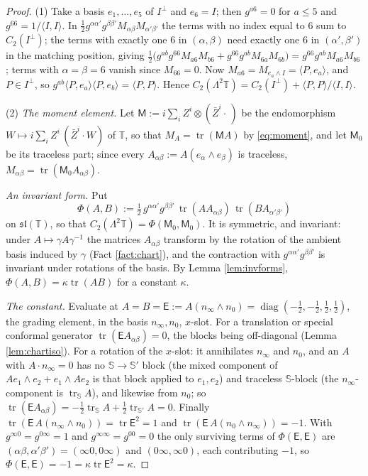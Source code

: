 \documentclass[11pt]{article}
\theoremstyle{definition}
\newcommand{\T}{\mathbb{T}}
\newcommand{\tr}{\operatorname{tr}}
\newcommand{\ip}[2]{\langle #1, #2\rangle}
\newcommand{\Sc}{\mathbb{S}}
\begin{document}
\begin{proof}
(1) Take a basis $e_{1}, \dots, e_{5}$ of $I^{\perp}$ and $e_{6} = I$; then $g^{a6} = 0$ for $a \le 5$ and $g^{66} = 1/\ip{I}{I}$. In $\tfrac12 g^{\alpha\alpha'}g^{\beta\beta'}M_{\alpha\beta}M_{\alpha'\beta'}$ the terms with no index equal to $6$ sum to $C_{2}(I^{\perp})$; the terms with exactly one $6$ in $(\alpha,\beta)$ need exactly one $6$ in $(\alpha',\beta')$ in the matching position, giving $\tfrac12\bigl(g^{ab}g^{66}M_{a6}M_{b6} + g^{66}g^{ab}M_{6a}M_{6b}\bigr) = g^{66}g^{ab}M_{a6}M_{b6}$; terms with $\alpha = \beta = 6$ vanish since $M_{66} = 0$. Now $M_{a6} = M_{e_{a}\wedge I} = \ip{P}{e_{a}}$, and $P \in I^{\perp}$, so $g^{ab}\ip{P}{e_{a}}\ip{P}{e_{b}} = \ip{P}{P}$. Hence $C_{2}(\Lambda^{2}\T) = C_{2}(I^{\perp}) + \ip{P}{P}/\ip{I}{I}$.

(2) \emph{The moment element.} Let $\mathsf{M} := i\sum_{i}Z^{i}\otimes(\bar{Z}^{i}\cdot\,)$ be the endomorphism $W \mapsto i\sum_{i}Z^{i}\,(\bar{Z}^{i}\cdot W)$ of $\T$, so that $M_{A} = \tr(\mathsf{M}A)$ by \eqref{eq:moment}, and let $\mathsf{M}_{0}$ be its traceless part; since every $A_{\alpha\beta} := A(e_{\alpha}\wedge e_{\beta})$ is traceless, $M_{\alpha\beta} = \tr(\mathsf{M}_{0}A_{\alpha\beta})$.

\emph{An invariant form.} Put
\[
\Phi(A, B) := \tfrac12\, g^{\alpha\alpha'}g^{\beta\beta'}\,\tr(AA_{\alpha\beta})\,\tr(BA_{\alpha'\beta'})
\]
on $\mathfrak{sl}(\T)$, so that $C_{2}(\Lambda^{2}\T) = \Phi(\mathsf{M}_{0}, \mathsf{M}_{0})$. It is symmetric, and invariant: under $A \mapsto \gamma A\gamma^{-1}$ the matrices $A_{\alpha\beta}$ transform by the rotation of the ambient basis induced by $\gamma$ (Fact \ref{fact:chart}), and the contraction with $g^{\alpha\alpha'}g^{\beta\beta'}$ is invariant under rotations of the basis. By Lemma \ref{lem:invforms}, $\Phi(A,B) = \kappa\tr(AB)$ for a constant $\kappa$.

\emph{The constant.} Evaluate at $A = B = \mathsf{E} := A(n_{\infty}\wedge n_{0}) = \operatorname{diag}(-\tfrac12,-\tfrac12,\tfrac12,\tfrac12)$, the grading element, in the basis $n_{\infty}, n_{0}$, $x$-slot. For a translation or special conformal generator $\tr(\mathsf{E}A_{\alpha\beta}) = 0$, the blocks being off-diagonal (Lemma \ref{lem:chartiso}). For a rotation of the $x$-slot: it annihilates $n_{\infty}$ and $n_{0}$, and an $A$ with $A\cdot n_{\infty} = 0$ has no $\Sc \to \Sc'$ block (the mixed component of $Ae_{1}\wedge e_{2} + e_{1}\wedge Ae_{2}$ is that block applied to $e_{1}, e_{2}$) and traceless $\Sc$-block (the $n_{\infty}$-component is $\tr_{\Sc}A$), and likewise from $n_{0}$; so $\tr(\mathsf{E}A_{\alpha\beta}) = -\tfrac12\tr_{\Sc}A + \tfrac12\tr_{\Sc'}A = 0$. Finally $\tr(\mathsf{E}\,A(n_{\infty}\wedge n_{0})) = \tr \mathsf{E}^{2} = 1$ and $\tr(\mathsf{E}\,A(n_{0}\wedge n_{\infty})) = -1$. With $g^{\infty 0} = g^{0\infty} = 1$ and $g^{\infty\infty} = g^{00} = 0$ the only surviving terms of $\Phi(\mathsf{E},\mathsf{E})$ are $(\alpha\beta, \alpha'\beta') = (\infty 0, 0\infty)$ and $(0\infty, \infty 0)$, each contributing $-1$, so $\Phi(\mathsf{E},\mathsf{E}) = -1 = \kappa\tr \mathsf{E}^{2} = \kappa$.


\end{proof}
\end{document}
